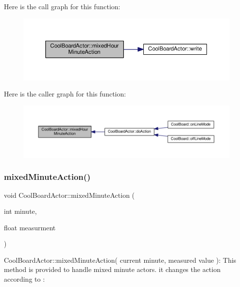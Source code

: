 Here is the call graph for this function\+:
\nopagebreak
\begin{figure}[H]
\begin{center}
\leavevmode
\includegraphics[width=350pt]{dc/d69/class_cool_board_actor_ae6b2a17b0e73cfeb353ded2cc4e08109_cgraph}
\end{center}
\end{figure}
Here is the caller graph for this function\+:
\nopagebreak
\begin{figure}[H]
\begin{center}
\leavevmode
\includegraphics[width=350pt]{dc/d69/class_cool_board_actor_ae6b2a17b0e73cfeb353ded2cc4e08109_icgraph}
\end{center}
\end{figure}
\mbox{\label{class_cool_board_actor_a2b8a79a27288d5246e3e3860ae76770d}} 
\subsubsection{\texorpdfstring{mixed\+Minute\+Action()}{mixedMinuteAction()}}
{\footnotesize\ttfamily void Cool\+Board\+Actor\+::mixed\+Minute\+Action (\begin{DoxyParamCaption}\item[{int}]{minute,  }\item[{float}]{measurment }\end{DoxyParamCaption})}

Cool\+Board\+Actor\+::mixed\+Minute\+Action( current minute, measured value )\+: This method is provided to handle mixed minute actors. it changes the action according to \+:

